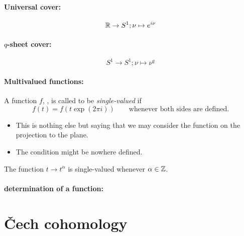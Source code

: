 \paragraph{Universal cover:}
\[
  \mathbb{R}\to S^1; \nu \mapsto e^{i\nu}
\]
\TODO{}

\paragraph{$q$-sheet cover:}
\[
  S^1\to S^1; \nu \mapsto \nu^q
\]
\TODO{}

\paragraph{Multivalued functions:}
\begin{defn}
  A function $f$, , is called to be \emph{single-valued} if
  \[
    f(t)=f(t\exp(2\pi i)) \qquad\text{whenever both sides are defined.}
  \]
  \begin{s-rem}
    \begin{itemize}
      \item This is nothing else but saying that we may consider the function
        on the projection to the plane.
      \item The condition might be nowhere defined.
    \end{itemize}
  \end{s-rem}
  \begin{s-exmp}
    The function $t\to t^\alpha$ is single-valued whenever $\alpha\in\mathbb{Z}$.
  \end{s-exmp}
\end{defn}
\TODO{}

\paragraph{determination of a function:}

\section{Čech cohomology}

